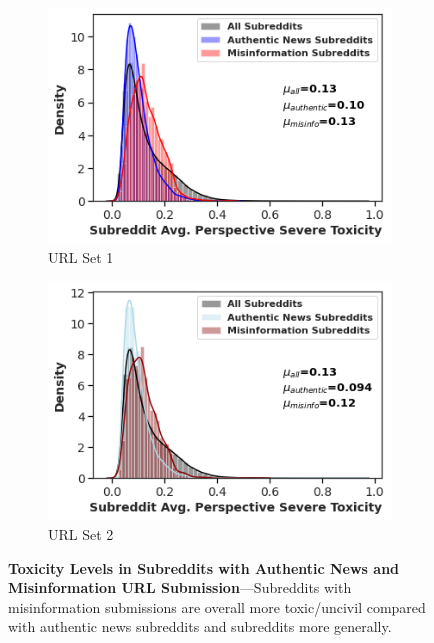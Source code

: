 \begin{figure}
\begin{subfigure}{.4\textwidth}
  \centering
  \includegraphics[width=1\linewidth]{figures/subreddit_toxicity_above10.png}
      \caption{URL Set 1}
\label{fig:harmonic-sub1}
\end{subfigure}%
\begin{subfigure}{.4\textwidth}
  \centering
  \includegraphics[width=1\linewidth]{figures/subreddit_toxicity_above10_2.png}
      \caption{URL Set 2}
  \label{fig:pagerank-sub2}
\end{subfigure}

\caption{\textbf{Toxicity Levels in Subreddits with Authentic News and Misinformation URL Submission}---Subreddits with misinformation submissions are overall more toxic/uncivil compared with authentic news subreddits and subreddits more generally.}
\label{fig:subreddit-misinformation-authentic-toxicity}
\end{figure}

